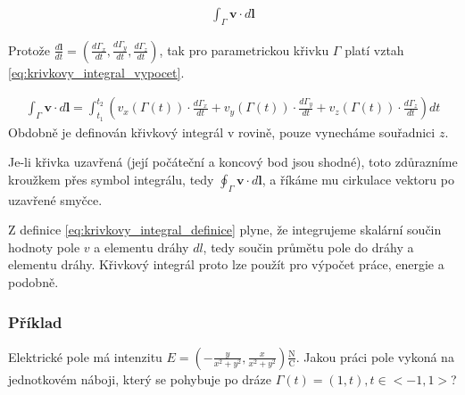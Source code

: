 \documentclass{book}
\newcommand{\vect}[1]{\boldsymbol{#1}}
\begin{document}
\begin{equation}
\label{eq:krivkovy_integral_definice}
\begin{split}
\int_\Gamma \vect{v} \cdot d\vect{l}
\end{split}
\end{equation}

Protože \(\frac{d\vect{l}}{dt} = \left(\frac{d \Gamma_x}{dt}, \frac{d \Gamma_y}{dt}, \frac{d \Gamma_z}{dt} \right)\), tak pro parametrickou křivku
\(\Gamma\) platí vztah \eqref{eq:krivkovy_integral_vypocet}.

\begin{equation}
\label{eq:krivkovy_integral_vypocet}
\begin{split}
\int_\Gamma \vect{v} \cdot d\vect{l} =
\int_{t_1}^{t_2} \left(v_x(\Gamma(t)) \cdot \frac{d \Gamma_x}{dt} + v_y(\Gamma(t)) \cdot \frac{d \Gamma_y}{dt} + v_z(\Gamma(t)) \cdot \frac{d \Gamma_z}{dt} \right) dt
\end{split}
\end{equation}
Obdobně je definován křivkový integrál v rovině, pouze vynecháme souřadnici \(z\).

Je-li křivka uzavřená (její počáteční a koncový bod jsou shodné), toto zdůrazníme kroužkem přes symbol integrálu, tedy \(\oint_\Gamma \vect{v} \cdot d\vect{l}\), a říkáme mu cirkulace vektoru po uzavřené smyčce.

Z definice \eqref{eq:krivkovy_integral_definice} plyne, že integrujeme skalární součin hodnoty pole \(v\) a elementu dráhy \(dl\),
tedy součin průmětu pole do dráhy a elementu dráhy. Křivkový integrál proto lze použít pro výpočet práce, energie a podobně.


\subsubsection{Příklad}

Elektrické pole má intenzitu \(E = \left(-\frac{y}{x^2+y^2}, \frac{x}{x^2+y^2}\right) \frac{\mathrm{N}}{\mathrm{C}}\). Jakou práci pole vykoná na jednotkovém náboji, který se pohybuje po dráze \(\Gamma(t) = (1, t), t \in <-1, 1>\)?


\end{document}
